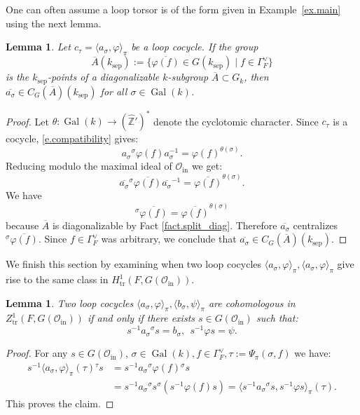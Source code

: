 \documentclass[12pt]{amsart}
\numberwithin{equation}{section}
\newtheorem{lemma}[theorem]{Lemma}
\theoremstyle{definition}
\newtheorem{convention}[theorem]{Convention}
\newcommand{\cO}{\mathcal{O}}
\newcommand{\bZ}{\mathbb{Z}}
\newcommand{\Gal}{\operatorname{Gal}}
\newcommand{\ol}{\overline}
\newcommand{\sep}{\operatorname{sep}}
\newcommand{\tr}{\operatorname{tr}}
\newcommand{\ksep}{k_{\sep}}
\newcommand{\oin}{\operatorname{in}}
\newcommand{\Oin}{\cO_{\oin}}
\newcommand{\vphi}{\varphi}
\newcommand{\I}[1]{\Gamma_{#1}^{\vee}}
\begin{document}

One can often assume a loop torsor is of the form given in Example~\ref{ex.main} using the next lemma.
\begin{lemma}\label{lem.centralize_over_residue}
    Let $c_\tau = \langle a_\sigma ,\vphi \rangle_\pi$ be a loop cocycle. If the group
    $$\overline{A}(\ksep):= \{ \overline{\vphi(f)} \in G(\ksep) \mid f\in\I{F}\}$$
    is the $\ksep$-points of a diagonalizable $k$-subgroup $\ol{A}\subset G_k$, then $\overline{a_\sigma}\in C_G(\ol{A})(\ksep)$ for all $\sigma\in \Gal(k)$.
\end{lemma}
\begin{proof}
Let $\theta: \Gal(k)\to (\hat{\bZ}')^*$ denote the cyclotomic character. Since $c_\tau$ is a cocycle, \eqref{e.compatibility} gives:
$$a_\sigma {}^\sigma \vphi(f) a_\sigma^{-1} = \vphi(f)^{\theta(\sigma)}.$$
Reducing modulo the maximal ideal of $\Oin$ we get:
$$\overline{a_\sigma} {}^{\sigma} \overline{\vphi(f)} \overline{a_\sigma}^{-1} = \overline{\vphi(f)}^{\theta(\sigma)}.$$
We have $${}^{\sigma} \overline{\vphi(f)} = \overline{\vphi(f)}^{\theta(\sigma)}$$ because $\overline{A}$ is diagonalizable by Fact \ref{fact.split_diag}. Therefore $\overline{a_\sigma}$ centralizes ${}^{\sigma} \overline{\vphi(f)}$. Since $f\in \I{F}$ was arbitrary, we conclude that $\overline{a_\sigma} \in C_G(\ol{A})(\ksep)$.
\end{proof}

We finish this section by examining when two loop cocycles $\langle a_\sigma,\vphi\rangle_{\pi},\langle a_\sigma,\vphi\rangle_{\pi}$ give rise to the same class in $H^1_{\tr}(F,G(\Oin))$.
\begin{lemma}\label{lem.cohomolog_criterion}
    Two loop cocycles $\langle a_\sigma,\vphi\rangle_\pi, \langle b_\sigma,\psi\rangle_\pi$ are cohomologous in $Z^1_{\tr}(F,G(\Oin))$ if and only if there exists $s\in G(\Oin)$ such that:
    \begin{equation}\label{e.27}
    s^{-1} a_\sigma {}^\sigma s = b_\sigma , \ \ s^{-1} \vphi  s =\psi.
    \end{equation}
\end{lemma}
\begin{proof}
    For any $s\in G(\Oin)$, $\sigma\in \Gal(k),f\in \I{F}, \tau:= \Psi_\pi(\sigma,f)$ we have:
    \begin{align*}
        s^{-1} \langle a_\sigma , \vphi\rangle_\pi (\tau) {}^\tau s &=s^{-1} a_\sigma {}^\sigma \vphi(f) {}^{\sigma} s \\
        &=s^{-1} a_\sigma {}^\sigma s {}^{\sigma} (s^{-1} \vphi(f) s) = \langle s^{-1} a_\sigma {}^\sigma s , s^{-1}\vphi s\rangle_\pi(\tau).  
    \end{align*}
    This proves the claim.
\end{proof}
\end{document}
